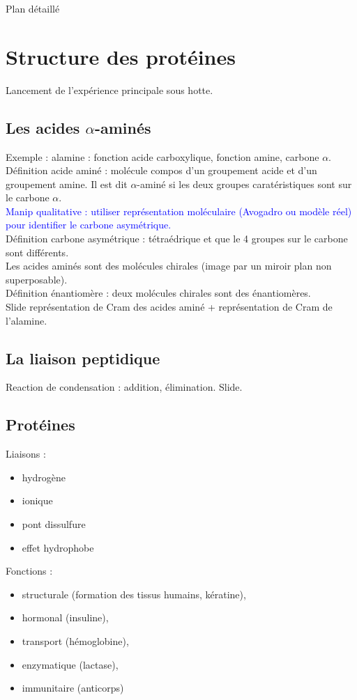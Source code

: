 \begin{reportBlock}{Plan détaillé}
\section{Structure des protéines}
Lancement de l'expérience principale sous hotte.

\subsection{Les acides $\alpha$-aminés}
Exemple : alamine : fonction acide carboxylique, fonction amine, carbone $\alpha$.\\

Définition acide aminé : molécule compos d'un groupement acide et d'un groupement amine. Il est dit $\alpha$-aminé si les deux groupes caratéristiques sont sur le carbone $\alpha$.\\

\textcolor{blue}{Manip qualitative : utiliser représentation moléculaire (Avogadro ou modèle réel) pour identifier le carbone asymétrique.}\\

Définition carbone asymétrique : tétraédrique et que le 4 groupes sur le carbone sont différents.\\
Les acides aminés sont des molécules chirales (image par un miroir plan non superposable).\\

Définition énantiomère : deux molécules chirales sont des énantiomères.\\

Slide représentation de Cram des acides aminé + représentation de Cram de l'alamine.

\subsection{La liaison peptidique}
Reaction de condensation : addition, élimination. Slide.

\subsection{Protéines}
Liaisons : 
\begin{itemize}
    \item hydrogène
    \item ionique
    \item pont dissulfure
    \item effet hydrophobe
\end{itemize}
Fonctions : 
\begin{itemize}
    \item structurale (formation des tissus humains, kératine),
    \item hormonal (insuline),
    \item transport (hémoglobine),
    \item enzymatique (lactase),
    \item immunitaire (anticorps)
\end{itemize}


\end{reportBlock}
